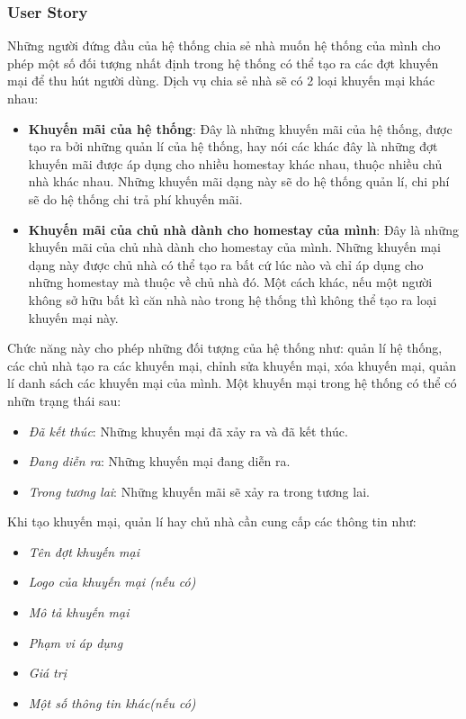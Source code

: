 \subsubsection{User Story}
Những người đứng đầu của hệ thống chia sẻ nhà muốn hệ thống của mình cho phép một số đối tượng nhất định trong hệ thống có thể tạo ra các đợt khuyến mại để thu hút người dùng. Dịch vụ chia sẻ nhà sẽ có 2 loại khuyến mại khác nhau:
\begin{itemize}
	\item  \textbf{Khuyến mãi của hệ thống}: Đây là những khuyến mãi của hệ thống, được tạo ra bởi những quản lí của hệ thống, hay nói các khác đây là những đợt khuyến mãi được áp dụng cho nhiều homestay khác nhau, thuộc nhiều chủ nhà khác nhau. Những khuyến mãi dạng này sẽ do hệ thống quản lí, chi phí sẽ do hệ thống chi trả phí khuyến mãi.
	\item \textbf{Khuyến mãi của chủ nhà dành cho homestay của mình}: Đây là những khuyến mãi của chủ nhà dành cho homestay của mình. Những khuyến mại dạng này được chủ nhà có thể tạo ra bất cứ lúc nào và chỉ áp dụng cho những homestay mà thuộc về chủ nhà đó. Một cách khác, nếu một người không sở hữu bất kì căn nhà nào trong hệ thống thì không thể tạo ra loại khuyến mại này.
\end{itemize}
Chức năng này cho phép những đối tượng của hệ thống như: quản lí hệ thống, các chủ nhà tạo ra các khuyến mại, chỉnh sửa khuyến mại, xóa khuyến mại, quản lí danh sách các khuyến mại của mình.
Một khuyến mại trong hệ thống có thể có nhữn trạng thái sau:
\begin{itemize}
	\item \textit{Đã kết thúc}: Những khuyến mại đã xảy ra và đã kết thúc.
	\item \textit{Đang diễn ra}: Những khuyến mại đang diễn ra.
	\item \textit{Trong tương lai}: Những khuyến mãi sẽ xảy ra trong tương lai.
\end{itemize}
Khi tạo khuyến mại, quản lí hay chủ nhà cần cung cấp các thông tin như: 
\begin{itemize}
	\item \textit{Tên đợt khuyến mại} 
	\item \textit{Logo của khuyến mại (nếu có)}
	\item \textit{Mô tả khuyến mại}
	\item \textit{Phạm vi áp dụng} 
	\item \textit{Giá trị} 
	\item \textit{Một số thông tin khác(nếu có)}
\end{itemize}
